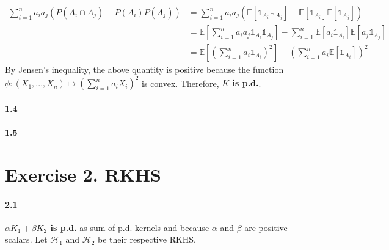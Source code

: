 \documentclass[10pt]{article}
\begin{document}
    \begin{align*}
        \sum_{i=1}^n a_i a_j (P(A_i \cap A_j) - P(A_i) P(A_j)) &= 
        \sum_{i=1}^n a_i a_j (\mathbb{E}[\mathds{1}_{A_i \cap A_j}] - 
        \mathbb{E}[\mathds{1}_{A_i}] \mathbb{E}[\mathds{1}_{A_j}])\\
        &= \mathbb{E}\left[\sum_{i=1}^n a_i a_j \mathds{1}_{A_i}\mathds{1}_{A_j} 
        \right] - \sum_{i=1}^n \mathbb{E}[a_i\mathds{1}_{A_i}] 
        \mathbb{E}[a_j\mathds{1}_{A_j}]\\
        &= \mathbb{E}\left[\left(\sum_{i=1}^n a_i\mathds{1}_{A_i}\right)^2
        \right] - \left(\sum_{i=1}^n a_i \mathbb{E}[\mathds{1}_{A_i}] \right)^2
    \end{align*}
    By Jensen's inequality, the above quantity is positive because the function
    $\phi: (X_1, ..., X_n) \mapsto (\sum_{i=1}^n a_i X_i)^2$ is convex. 
    Therefore, \textbf{$K$ is p.d.}.
    \paragraph{1.4}
    \paragraph{1.5}

    \section*{Exercise 2. RKHS}
    \paragraph{2.1} \textbf{$\alpha K_1 + \beta K_2$ is p.d.} as sum of p.d. 
    kernels and because $\alpha$ and $\beta$ are positive scalars. Let 
    $\mathcal{H}_1$ and $\mathcal{H}_2$ be their respective RKHS.
\end{document}
